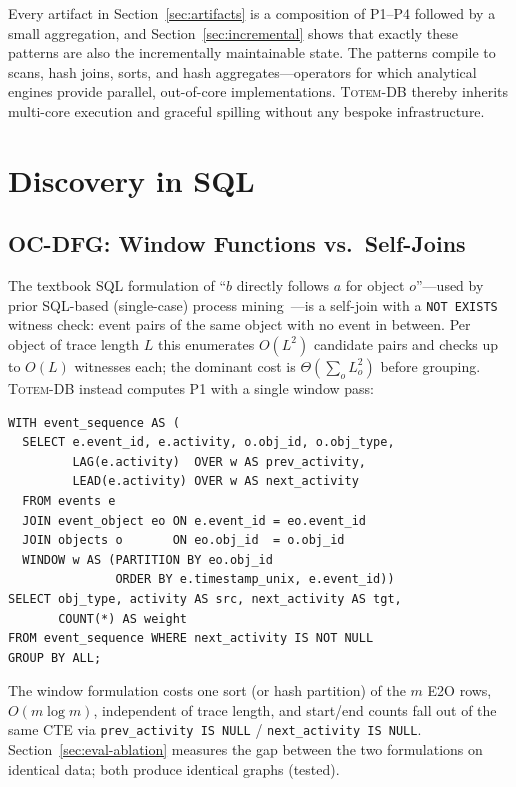 \documentclass[sigconf, nonacm]{acmart}
\newcommand{\sys}{\textsc{Totem-DB}\xspace}
\begin{document}
Every artifact in Section~\ref{sec:artifacts} is a composition of P1--P4 followed by a small aggregation, and Section~\ref{sec:incremental} shows that exactly these patterns are also the incrementally maintainable state. The patterns compile to scans, hash joins, sorts, and hash aggregates---operators for which analytical engines provide parallel, out-of-core implementations. \sys thereby inherits multi-core execution and graceful spilling without any bespoke infrastructure.

\section{Discovery in SQL}
\label{sec:algorithms}

\subsection{OC-DFG: Window Functions vs.\ Self-Joins}
\label{sec:ocdfg-sql}

The textbook SQL formulation of ``$b$ directly follows $a$ for object $o$''---used by prior SQL-based (single-case) process mining~\cite{schonig2016sql}---is a self-join with a \texttt{NOT EXISTS} witness check: event pairs of the same object with no event in between. Per object of trace length $L$ this enumerates $O(L^2)$ candidate pairs and checks up to $O(L)$ witnesses each; the dominant cost is $\Theta(\sum_o L_o^2)$ before grouping. \sys instead computes P1 with a single window pass:

\begin{lstlisting}[caption={OC-DFG core (P1). Three further aggregations over the same CTE yield node frequencies and start/end counts.},label={lst:ocdfg}]
WITH event_sequence AS (
  SELECT e.event_id, e.activity, o.obj_id, o.obj_type,
         LAG(e.activity)  OVER w AS prev_activity,
         LEAD(e.activity) OVER w AS next_activity
  FROM events e
  JOIN event_object eo ON e.event_id = eo.event_id
  JOIN objects o       ON eo.obj_id  = o.obj_id
  WINDOW w AS (PARTITION BY eo.obj_id
               ORDER BY e.timestamp_unix, e.event_id))
SELECT obj_type, activity AS src, next_activity AS tgt,
       COUNT(*) AS weight
FROM event_sequence WHERE next_activity IS NOT NULL
GROUP BY ALL;
\end{lstlisting}

The window formulation costs one sort (or hash partition) of the $m$ E2O rows, $O(m \log m)$, independent of trace length, and start/end counts fall out of the same CTE via \texttt{prev\_activity IS NULL} / \texttt{next\_activity IS NULL}. Section~\ref{sec:eval-ablation} measures the gap between the two formulations on identical data; both produce identical graphs (tested).
\end{document}
